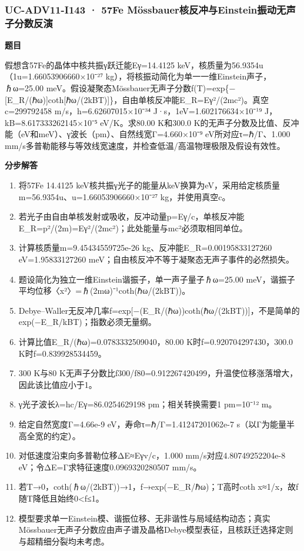 \documentclass[UTF8,11pt,a4paper]{ctexart}
\begin{document}
\subsubsection*{UC-ADV11-I143 · 57Fe Mössbauer核反冲与Einstein振动无声子分数反演}
\noindent\textbf{题目}\par
假想含57Fe的晶体中核共振γ跃迁能Eγ=14.4125 keV，核质量为56.9354u（1u=1.66053906660×10⁻²⁷ kg），将核振动简化为单一一维Einstein声子，ℏω=25.00 meV。假设凝聚态Mössbauer无声子分数f(T)=exp\{−[E\_R/(ℏω)]coth[ℏω/(2kBT)]\}，自由单核反冲能E\_R=Eγ²/(2mc²)。真空c=299792458 m/s，h=6.62607015×10⁻³⁴ J·s，1eV=1.602176634×10⁻¹⁹ J，kB=8.617333262145×10⁻⁵ eV/K。求80.00 K和300.0 K的无声子分数及比值、反冲能（eV和meV）、γ波长（pm）、自然线宽Γ=4.660×10⁻⁹ eV所对应τ=ℏ/Γ、1.000 mm/s多普勒能移与等效线宽速度，并检查低温/高温物理极限及假设有效性。\par
\medskip\noindent\textbf{分步解答}
\begin{enumerate}
\item 将57Fe 14.4125 keV核共振γ光子的能量从keV换算为eV，采用给定核质量m=56.9354u、u=1.66053906660×10⁻²⁷ kg，并使用真空c。
\item 若光子由自由单核发射或吸收，反冲动量p=Eγ/c，单核反冲能E\_R=p²/(2m)=Eγ²/(2mc²)；此处能量与mc²必须取相同单位。
\item 计算核质量m=9.45434559725e-26 kg、反冲能E\_R=0.00195833127260 eV=1.95833127260 meV；自由核反冲不等于凝聚态无声子事件的必然损失。
\item 题设简化为独立一维Einstein谐振子，单一声子量子ℏω=25.00 meV，谐振子平均位移〈x²〉=ℏ(2mω)⁻¹coth(ℏω/(2kBT))。
\item Debye–Waller无反冲几率f=exp[−(E\_R/(ℏω))coth(ℏω/(2kBT))]，不是简单的exp(−E\_R/kBT)；指数必须无量纲。
\item 计算比值E\_R/(ℏω)=0.0783332509040，80.00 K时f=0.920704297430，300.0 K时f=0.839928534459。
\item 300 K与80 K无声子分数比f300/f80=0.912267420499，升温使位移涨落增大，因此该比值应小于1。
\item γ光子波长λ=hc/Eγ=86.0254629198 pm；相关转换需要1 pm=10⁻¹² m。
\item 给定自然宽度Γ=4.66e-9 eV，寿命τ=ℏ/Γ=1.41247201062e-7 s（以Γ为能量半高全宽的约定）。
\item 对低速度沿束向多普勒位移ΔE≈Eγv/c，1.000 mm/s对应4.80749252204e-8 eV；令ΔE=Γ求特征速度0.0969320280507 mm/s。
\item 若T→0，coth(ℏω/(2kBT))→1，f→exp(−E\_R/ℏω)；T高时coth x≈1/x，故f随T降低且始终0<f≤1。
\item 模型要求单一Einstein模、谐振位移、无非谐性与局域结构动态；真实Mössbauer无声子分数应由声子谱及晶格Debye模型表征，且核跃迁选择定则与超精细分裂均未考虑。
\end{enumerate}
\end{document}
